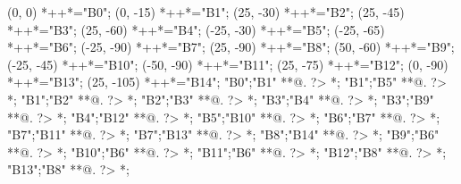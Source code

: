 \documentclass[portrait]{article}
\begin{document}
\begin{scriptsize}
\xy(0, 0)
	*++{}*\frm{-,}="B0";
(0, -15)
	*++{}*\frm{-,}="B1";
(25, -30)
	*++{}*\frm{-,}="B2";
(25, -45)
	 *++{}*\frm{-,}="B3";
(25, -60)
	*++{}*\frm{-,}="B4";
(-25, -30)
	*++{}*\frm{-,}="B5";
(-25, -65)
	 *++{}*\frm{-,}="B6";
(-25, -90)
	 *++{}*\frm{-,}="B7";
(25, -90)
	*++{}*\frm{-,}="B8";
(50, -60)
	*++{}*\frm{-,}="B9";
(-25, -45)
	*++{}*\frm{-,}="B10";
(-50, -90)
	*++{}*\frm{-,}="B11";
(25, -75)
	*++{}*\frm{-,}="B12";
(0, -90)
	*++{}*\frm{-,}="B13";
(25, -105)
	*++{}*\frm{-,}="B14";
"B0";"B1" **@{.} ?> *{\dir{>}};
"B1";"B5" **@{.} ?> *{\dir{>}};
"B1";"B2" **@{.} ?> *{\dir{>}};
"B2";"B3" **@{.} ?> *{\dir{>}};
"B3";"B4" **@{.} ?> *{\dir{>}};
"B3";"B9" **@{.} ?> *{\dir{>}};
"B4";"B12" **@{.} ?> *{\dir{>}};
"B5";"B10" **@{.} ?> *{\dir{>}};
"B6";"B7" **@{.} ?> *{\dir{>}};
"B7";"B11" **@{.} ?> *{\dir{>}};
"B7";"B13" **@{.} ?> *{\dir{>}};
"B8";"B14" **@{.} ?> *{\dir{>}};
"B9";"B6" **@{.} ?> *{\dir{>}};
"B10";"B6" **@{.} ?> *{\dir{>}};
"B11";"B6" **@{.} ?> *{\dir{>}};
"B12";"B8" **@{.} ?> *{\dir{>}};
"B13";"B8" **@{.} ?> *{\dir{>}};
\endxy
\end{scriptsize}
\end{document}
